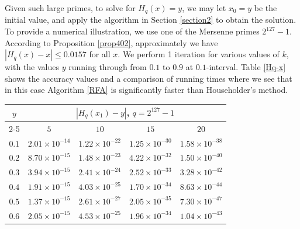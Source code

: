 \documentclass{article}
\begin{document}
Given such large primes, to solve for $H_{q}(x)=y$, we may let $x_{0}=y$ be the initial value, and apply the algorithm in Section \ref{section2} to obtain the solution. To provide a numerical illustration, we use one of the Mersenne primes $2^{127}-1$. According to Proposition \ref{prop402}, approximately we have $|H_{q}(x)-x|\leq 0.0157$ for all $x$. We perform 1 iteration for various values of $k$, with the  values $y$ running through from $0.1$ to $0.9$ at $0.1$-interval. Table \ref{Hq-x} shows the accuracy values and a comparison of running times  where we see that in this case Algorithm \ref{RFA} is significantly faster than Householder's method. 


\begin{table}[t]
	\centering
\begin{tabular}{|c|cccc|}
\hline
\multirow{2}{*}{$y$} & \multicolumn{4}{c|}{$|H_{q}(x_{1})-y|$, $q=2^{127}-1$}                                                                                                                      \\ \cline{2-5} 
                     & \multicolumn{1}{c|}{$5$}                   & \multicolumn{1}{c|}{$10$}                  & \multicolumn{1}{c|}{$15$}                  & $20$                  \\ \hline
$0.1$                & \multicolumn{1}{c|}{$2.01\times 10^{-14}$} & \multicolumn{1}{c|}{$1.22\times 10^{-22}$} & \multicolumn{1}{c|}{$1.25\times 10^{-30}$} & $1.58\times 10^{-38}$ \\ \hline
$0.2$                & \multicolumn{1}{c|}{$8.70\times 10^{-15}$} & \multicolumn{1}{c|}{$1.48\times 10^{-23}$} & \multicolumn{1}{c|}{$4.22\times 10^{-32}$} & $1.50\times 10^{-40}$ \\ \hline
$0.3$                & \multicolumn{1}{c|}{$3.94\times 10^{-15}$} & \multicolumn{1}{c|}{$2.41\times 10^{-24}$} & \multicolumn{1}{c|}{$2.52\times 10^{-33}$} & $3.28\times 10^{-42}$ \\ \hline
$0.4$                & \multicolumn{1}{c|}{$1.91\times 10^{-15}$} & \multicolumn{1}{c|}{$4.03\times 10^{-25}$} & \multicolumn{1}{c|}{$1.70\times 10^{-34}$} & $8.63\times 10^{-44}$ \\ \hline
$0.5$                & \multicolumn{1}{c|}{$1.37\times 10^{-15}$} & \multicolumn{1}{c|}{$2.61\times 10^{-27}$} & \multicolumn{1}{c|}{$2.05\times 10^{-35}$} & $7.30\times 10^{-47}$ \\ \hline
$0.6$                & \multicolumn{1}{c|}{$2.05\times 10^{-15}$} & \multicolumn{1}{c|}{$4.53\times 10^{-25}$} & \multicolumn{1}{c|}{$1.96\times 10^{-34}$} & $1.04\times 10^{-43}$ \\ \hline

\end{tabular}
\end{table}
\end{document}
